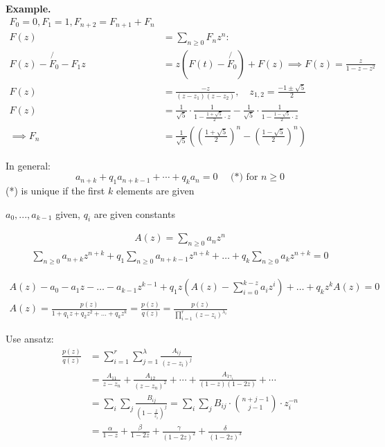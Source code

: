 \textbf{Example.}
\begin{align*}
    F_0 = 0, F_1 = 1, F_{n+2} = F_{n+1} + F_n \\
    F(z) &= \sum_{n≥0} F_n z^n : \\
    F(z) - \not{F_0} - F_1 z &= z \left( F(t) - \not{F_0} \right) + F(z)
        \implies F(z) = \frac{z}{1-z-z^2} \\
    F(z) &= \frac{-z}{(z-z_1) (z-z_2)}, 
        \quad z_{1,2} = \frac{-1 \pm \sqrt{5}}{2} \\
    F(z) &= \frac1{\sqrt{5}} \cdot \frac{1}{1- \frac{1 + \sqrt{5}}{2} \cdot z} - \frac{1}{\sqrt{5}} \cdot \frac{1}{1- \frac{1 - \sqrt{5}}{2} \cdot z}  \\
    \implies F_n &= \frac{1}{\sqrt{5}} 
		\left( \left( \frac{1+ \sqrt 5}{2} \right)^n 
		- \left( \frac{1-\sqrt{5}}{2} \right)^n 
		\right)
\end{align*}


In general:
\[
    a_{n+k} + q_1 a_{n+k-1} + \cdots + q_k a_n = 0
    \quad  \text{ (*) for }n \geq 0
\]
(*) is unique if the first $k$ elements are given

$a_0, ..., a_{k-1}$ given, $q_i$ are given constants

\begin{align*}
A(z) = \sum_{n\geq 0} a_n z^n
\end{align*}
\begin{align*}
\sum_{n\geq 0} a_{n+k} z^{n+k} + q_1 \sum_{n\geq 0}  a_{n+k-1}z^{n+k} + \ldots + q_k \sum_{n\geq 0} a_k z^{n+k} = 0
\end{align*}

\begin{align*}
A(z) - a_0 - a_1 z - \ldots - a_{k-1} z^{k-1} + q_1 z \left( A(z) - \sum_{i=0}^{k-z} a_i z^i \right) + \ldots + q_k z^k A(z) = 0\\
A(z) = \frac{ p(z) }{ 1 + q_1 z + q_2 z^2 + \ldots + q_k z^k } = \frac{p(z)}{q(z)} = \frac{p(z)}{\prod_{i=1}^{r} (z - z_i)^{\lambda_i}}
\end{align*}


Use ansatz: 
\begin{align*}
\frac{p(z)}{q(z)} &= \sum_{i=1}^{r} \sum_{j=1}^{\lambda} \frac{A_{ij}}{(z-z_i)^j} \\
&= \frac{A_{11}}{z-z_n} + \frac{A_{12}}{(z-z_n)^2} + \cdots + \frac{A_{1\gamma_i}}{(1-z)(1-2z)} + \cdots \\
&= \sum_i\sum_j \frac{B_{ij}}{\left(1-\frac{z}{z_i}\right)^j}= \sum_i\sum_j B_{ij} \cdot \binom {n+j-1}{j-1} \cdot z_i^{-n}\\
&= \frac{\alpha}{1-z} + \frac{\beta}{1-2z} + \frac{\gamma}{(1-2z)^2} + \frac{\delta}{(1-2z)^3}
\end{align*}

